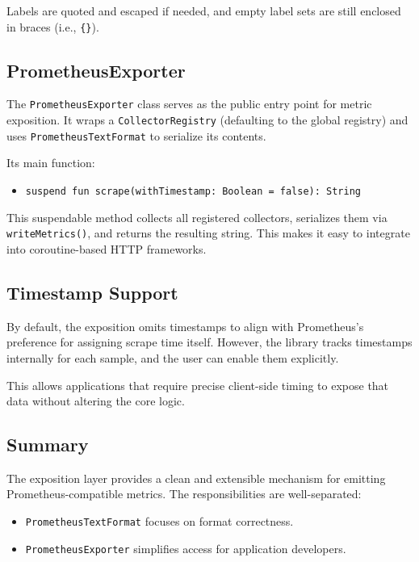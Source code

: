 Labels are quoted and escaped if needed, and empty label sets are still enclosed in braces (i.e., \texttt{\{\}}).

\subsection{PrometheusExporter}\label{subsec:prometheusexporter}

The \texttt{PrometheusExporter} class serves as the public entry point for metric exposition.
It wraps a \texttt{CollectorRegistry} (defaulting to the global registry) and uses \texttt{PrometheusTextFormat} to serialize its contents.

Its main function:

\begin{itemize}
    \item \texttt{suspend fun scrape(withTimestamp: Boolean = false): String}
\end{itemize}

This suspendable method collects all registered collectors, serializes them via \texttt{writeMetrics()}, and returns the resulting string.
This makes it easy to integrate into coroutine-based HTTP frameworks.

\subsection{Timestamp Support}\label{subsec:timestamp-support}

By default, the exposition omits timestamps to align with Prometheus's preference for assigning scrape time itself.
However, the library tracks timestamps internally for each sample, and the user can enable them explicitly.

This allows applications that require precise client-side timing to expose that data without altering the core logic.

\subsection{Summary}\label{subsec:summary}

The exposition layer provides a clean and extensible mechanism for emitting Prometheus-compatible metrics.
The responsibilities are well-separated:

\begin{itemize}
    \item \texttt{PrometheusTextFormat} focuses on format correctness.
    \item \texttt{PrometheusExporter} simplifies access for application developers.
\end{itemize}

